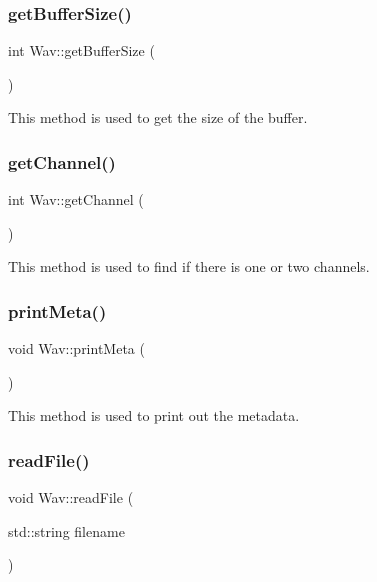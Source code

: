 \subsubsection{\texorpdfstring{get\+Buffer\+Size()}{getBufferSize()}}
{\footnotesize\ttfamily int Wav\+::get\+Buffer\+Size (\begin{DoxyParamCaption}{ }\end{DoxyParamCaption})}

This method is used to get the size of the buffer. \mbox{\label{classWav_a271d6ddb273af4e9bd8005f43c2e1c9c}} 
\subsubsection{\texorpdfstring{get\+Channel()}{getChannel()}}
{\footnotesize\ttfamily int Wav\+::get\+Channel (\begin{DoxyParamCaption}{ }\end{DoxyParamCaption})}

This method is used to find if there is one or two channels. \mbox{\label{classWav_abfa4f9851327536ab574fd465eaf4fb2}} 
\subsubsection{\texorpdfstring{print\+Meta()}{printMeta()}}
{\footnotesize\ttfamily void Wav\+::print\+Meta (\begin{DoxyParamCaption}{ }\end{DoxyParamCaption})}

This method is used to print out the metadata. \mbox{\label{classWav_a691dd4fbe69185828a92a5b51ab80267}} 
\subsubsection{\texorpdfstring{read\+File()}{readFile()}}
{\footnotesize\ttfamily void Wav\+::read\+File (\begin{DoxyParamCaption}\item[{std\+::string}]{filename }\end{DoxyParamCaption})}

